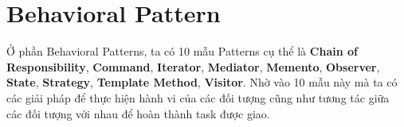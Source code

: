 \section{Behavioral Pattern}
Ở phần Behavioral Patterns, ta có 10 mẫu Patterns cụ thể là \textbf{Chain of Responsibility}, \textbf{Command}, \textbf{Iterator}, \textbf{Mediator}, \textbf{Memento}, \textbf{Observer}, \textbf{State}, \textbf{Strategy}, \textbf{Template Method}, \textbf{Visitor}. Nhờ vào 10 mẫu này mà ta có các giải pháp để thực hiện hành vi của các đối tượng cũng như tương tác giữa các đối tượng với nhau để hoàn thành task được giao.\\










